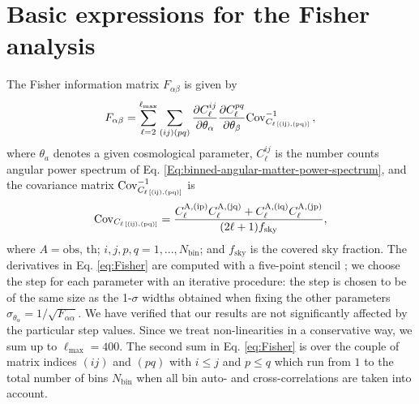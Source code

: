 \chapter{Basic expressions for the Fisher analysis}
\label{appendix2-mnu}

The Fisher information matrix $F_{\alpha\beta}$ is given by
\begin{equation}
F_{\alpha\beta} =
\sum_{\ell=2}^{\ell_{\mathrm{max}}} \sum_{(ij)(pq)} \frac{\partial C_\ell^{ij}}{\partial \theta_\alpha}
\frac{\partial C_\ell^{pq}}{\partial
\theta_\beta} {{\rm Cov}_{C_{\ell \, \rm[(ij), (pq)]}}^{-1}} \, ,
\label{eq:Fisher}
\end{equation}
where $\theta_a$ denotes a given cosmological parameter, $C_\ell^{ij}$ is the number counts angular power spectrum of Eq. \eqref{Eq:binned-angular-matter-power-spectrum}, and the covariance matrix ${{\rm Cov}_{C_{\ell \, \rm[(ij), (pq)]}}^{-1}}$ is
\begin{equation}
\label{eq:err-clgt}
{\rm Cov}_{C_{\ell \, \rm[(ij), (pq)]}} = \frac{C^{\rm A, (ip)}_{\ell} C^{\rm A, (jq)}_{\ell} + C^{\rm A, (iq)}_{\ell} C^{\rm A, (jp)}_{\ell}}{(2\ell+1)f_{\rm sky}},
\end{equation}
where $A=\mathrm{obs},\,\mathrm{th}$; $i,j,p,q = 1,...,N_{\mathrm{bin}}$; and $f_{\mathrm{sky}}$ is the covered sky fraction. The derivatives in Eq. \eqref{eq:Fisher} are computed with a five-point stencil \cite{Montanari:2015rga}; we  choose the step for each parameter with an iterative procedure: the step is chosen to be of the same size as the 1-$\sigma$ widths obtained when fixing the other parameters $\sigma_{\theta_{\alpha}}=1/\sqrt{F_{\alpha\alpha}}$.
We have verified that our results are not significantly affected by the particular step values. Since we treat non-linearities in a conservative way, we sum up to $\ell_{\mathrm{max}}=400$. The second sum in Eq. \eqref{eq:Fisher} is over the couple of matrix indices $(ij)$ and $(pq)$ with $i \leq j$ and $p \leq q$ which run from $1$ to the total number of bins $N_{\mathrm{bin}}$ when all bin auto- and cross-correlations are taken into account.

